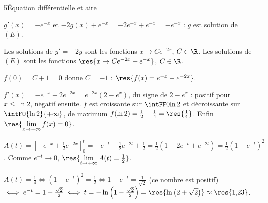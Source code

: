 \begin{corrigeBac}{5}{Équation différentielle et aire}
\begin{questions}
  \item $g'(x)=-e^{-x}$ et $-2g(x)+e^{-x}=-2e^{-x}+e^{-x}=-e^{-x}$ : $g$ est solution de $(E)$. 
  \item Les solutions de $y'=-2y$ sont les fonctions $x\mapsto Ce^{-2x}$, $C\in\R$. Les solutions de $(E)$ sont les fonctions
    $\res{x\mapsto Ce^{-2x}+e^{-x}}$, $C\in\R$. \pts{1 pt}
  \item $f(0)=C+1=0$ donne $C=-1$ : $\res{f(x)=e^{-x}-e^{-2x}}$. 
  \item $f'(x)=-e^{-x}+2e^{-2x}=e^{-2x}\left(2-e^{x}\right)$, du signe de $2-e^{x}$ : positif pour $x\leq\ln2$, négatif ensuite. $f$ est
    croissante sur $\intFF0{\ln2}$ et décroissante sur $\intFO{\ln2}{+\infty}$, de maximum $f(\ln2)=\frac12-\frac14=\res{\tfrac14}$. Enfin
    $\res{\lim\limits_{x\to+\infty}f(x)=0}$. 
  \item $A(t)=\left[-e^{-x}+\frac12e^{-2x}\right]_0^{t}=-e^{-t}+\frac12e^{-2t}+\frac12=\frac12\left(1-2e^{-t}+e^{-2t}\right)=\frac12\left(1-e^{-t}\right)^{2}$.
    Comme $e^{-t}\to0$, $\res{\lim\limits_{t\to+\infty}A(t)=\tfrac12}$. \pts{1 pt}
  \item $A(t)=\frac14\iff\left(1-e^{-t}\right)^{2}=\frac12\iff1-e^{-t}=\frac{1}{\sqrt2}$ (ce nombre est positif) $\iff
    e^{-t}=1-\frac{\sqrt2}{2}\iff t=-\ln\left(1-\tfrac{\sqrt2}{2}\right)=\res{\ln\big(2+\sqrt2\big)}\approx\res{1{,}23}$. 
\end{questions}
\end{corrigeBac}
